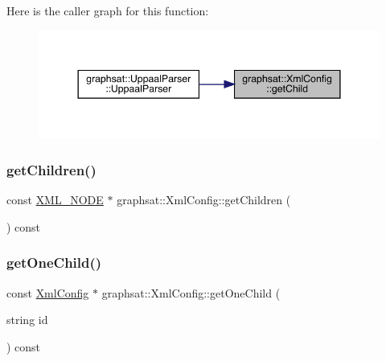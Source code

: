 Here is the caller graph for this function\+:\nopagebreak
\begin{figure}[H]
\begin{center}
\leavevmode
\includegraphics[width=344pt]{classgraphsat_1_1_xml_config_a7db6e5780e6eecff5c904b909eaefe22_icgraph}
\end{center}
\end{figure}
\mbox{\label{classgraphsat_1_1_xml_config_ab5960dd0175af1434fedc80d43f3dcf6}} 
\subsubsection{\texorpdfstring{getChildren()}{getChildren()}}
{\footnotesize\ttfamily const \mbox{\hyperlink{namespacegraphsat_a8b991d53e7169027cb0197e267a5915b}{X\+M\+L\+\_\+\+N\+O\+DE}} $\ast$ graphsat\+::\+Xml\+Config\+::get\+Children (\begin{DoxyParamCaption}{ }\end{DoxyParamCaption}) const}

\mbox{\label{classgraphsat_1_1_xml_config_afcc69a80121ee6d026c5da49defb566b}} 
\subsubsection{\texorpdfstring{getOneChild()}{getOneChild()}}
{\footnotesize\ttfamily const \mbox{\hyperlink{classgraphsat_1_1_xml_config}{Xml\+Config}} $\ast$ graphsat\+::\+Xml\+Config\+::get\+One\+Child (\begin{DoxyParamCaption}\item[{string}]{id }\end{DoxyParamCaption}) const}

